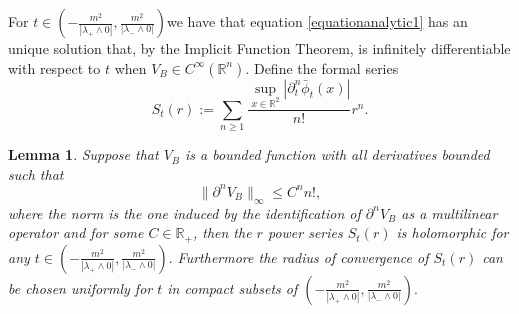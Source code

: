 \documentclass[a4paper,10pt]{article}
\newcommand{\assign}{:=}
\newtheorem{lemma}{Lemma}
\begin{document}
For $t \in \left( - \frac{m^2}{| \lambda_+ \wedge 0 |}, \frac{m^2}{|
\lambda_- \wedge 0 |} \right) $we have that equation
{\eqref{equationanalytic1}} has an unique solution that, by the Implicit
Function Theorem, is infinitely differentiable with respect to $t$ when $V_B
\in C^{\infty} (\mathbb{R}^n)$. Define the formal series
\begin{equation}
  S_t (r) \assign \sum_{n \geqslant 1} \frac{\sup_{x \in \mathbb{R}^2}  |
  \partial^n_t \bar{\phi}_t (x) |}{n!} r^n . \label{equationserie1}
\end{equation}


\begin{lemma}
  \label{lemma_serie1}Suppose that $V_B$ is a bounded function with all
  derivatives bounded such that
  \[ \| \partial^n V_B \|_{\infty} \leqslant C^n n!, \]
  where the norm is the one induced by the identification of $\partial^n V_B$
  as a multilinear operator and for some $C \in \mathbb{R}_+$, then the $r$
  power series $S_t (r)$ is holomorphic for any $t \in \left( - \frac{m^2}{|
  \lambda_+ \wedge 0 |}, \frac{m^2}{| \lambda_- \wedge 0 |} \right) .$
  Furthermore the radius of convergence of $S_t (r)$ can be chosen uniformly
  for $t$ in compact subsets of $\left( - \frac{m^2}{| \lambda_+ \wedge 0 |},
  \frac{m^2}{| \lambda_- \wedge 0 |} \right) .$
\end{lemma}
\end{document}
